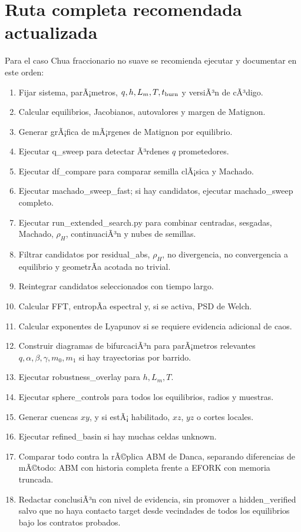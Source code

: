 \documentclass[11pt]{article}
\DeclareRobustCommand{\codepath}[1]{\begingroup\Urlmuskip=0mu plus 2mu\path{#1}\endgroup}
\def\codepath#1{#1}%
\begin{document}
\section{Ruta completa recomendada actualizada}
\label{sec:ruta_completa_actualizada}

Para el caso Chua fraccionario no suave se recomienda ejecutar y documentar en este orden:

\begin{enumerate}
\item Fijar sistema, parÃ¡metros, \(q,h,L_m,T,t_{\rm burn}\) y versiÃ³n de cÃ³digo.
\item Calcular equilibrios, Jacobianos, autovalores y margen de Matignon.
\item Generar grÃ¡fica de mÃ¡rgenes de Matignon por equilibrio.
\item Ejecutar \codepath{q_sweep} para detectar Ã³rdenes \(q\) prometedores.
\item Ejecutar \codepath{df_compare} para comparar semilla clÃ¡sica y Machado.
\item Ejecutar \codepath{machado_sweep_fast}; si hay candidatos, ejecutar \codepath{machado_sweep} completo.
\item Ejecutar \codepath{run_extended_search.py} para combinar centradas, sesgadas, Machado, \(\rho_H\), continuaciÃ³n y nubes de semillas.
\item Filtrar candidatos por \codepath{residual_abs}, \(\rho_H\), no divergencia, no convergencia a equilibrio y geometrÃ­a acotada no trivial.
\item Reintegrar candidatos seleccionados con tiempo largo.
\item Calcular FFT, entropÃ­a espectral y, si se activa, PSD de Welch.
\item Calcular exponentes de Lyapunov si se requiere evidencia adicional de caos.
\item Construir diagramas de bifurcaciÃ³n para parÃ¡metros relevantes \(q,\alpha,\beta,\gamma,m_0,m_1\) si hay trayectorias por barrido.
\item Ejecutar \codepath{robustness_overlay} para \(h,L_m,T\).
\item Ejecutar \codepath{sphere_controls} para todos los equilibrios, radios y muestras.
\item Generar cuencas \(xy\), y si estÃ¡ habilitado, \(xz\), \(yz\) o cortes locales.
\item Ejecutar \codepath{refined_basin} si hay muchas celdas \codepath{unknown}.
\item Comparar todo contra la rÃ©plica ABM de Danca, separando diferencias de mÃ©todo: ABM con historia completa frente a EFORK con memoria truncada.
\item Redactar conclusiÃ³n con nivel de evidencia, sin promover a \codepath{hidden_verified} salvo que no haya contacto target desde vecindades de todos los equilibrios bajo los contratos probados.
\end{enumerate}
\end{document}
